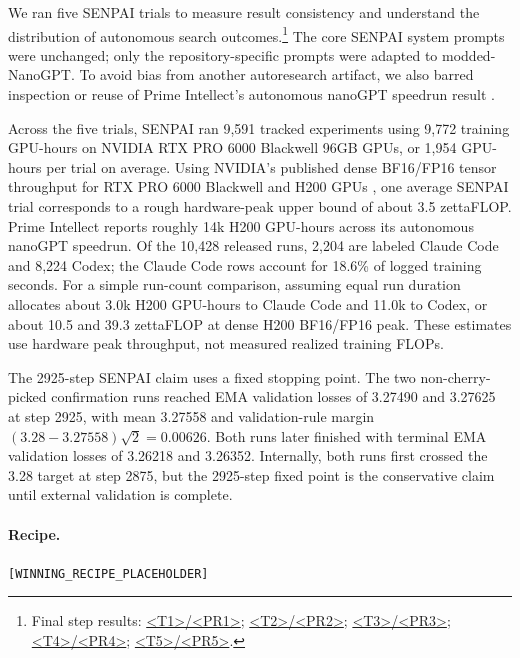 \documentclass{article}
\begin{document}
We ran five SENPAI trials to measure result consistency and understand the distribution of autonomous search outcomes.\footnote{Final step results: \href{https://github.com/morganmcg1/modded-nanogpt-senpai/pull/T1}{<T1>/<PR1>}; \href{https://github.com/morganmcg1/modded-nanogpt-senpai/pull/T2}{<T2>/<PR2>}; \href{https://github.com/morganmcg1/modded-nanogpt-senpai/pull/T3}{<T3>/<PR3>}; \href{https://github.com/morganmcg1/modded-nanogpt-senpai/pull/T4}{<T4>/<PR4>}; \href{https://github.com/morganmcg1/modded-nanogpt-senpai/pull/T5}{<T5>/<PR5>}.} The core SENPAI system prompts were unchanged; only the repository-specific prompts were adapted to modded-NanoGPT. To avoid bias from another autoresearch artifact, we also barred inspection or reuse of Prime Intellect's autonomous nanoGPT speedrun result \citep{primeintellect2026autonanogpt}.

Across the five trials, SENPAI ran 9,591 tracked experiments using 9,772 training GPU-hours on NVIDIA RTX PRO 6000 Blackwell 96GB GPUs, or 1,954 GPU-hours per trial on average. Using NVIDIA's published dense BF16/FP16 tensor throughput for RTX PRO 6000 Blackwell and H200 GPUs \citep{nvidia2025rtxpro6000blackwell,nvidia2026h200}, one average SENPAI trial corresponds to a rough hardware-peak upper bound of about 3.5 zettaFLOP. Prime Intellect reports roughly 14k H200 GPU-hours across its autonomous nanoGPT speedrun. Of the 10,428 released runs, 2,204 are labeled Claude Code and 8,224 Codex; the Claude Code rows account for 18.6\% of logged training seconds. For a simple run-count comparison, assuming equal run duration allocates about 3.0k H200 GPU-hours to Claude Code and 11.0k to Codex, or about 10.5 and 39.3 zettaFLOP at dense H200 BF16/FP16 peak. These estimates use hardware peak throughput, not measured realized training FLOPs.

The 2925-step SENPAI claim uses a fixed stopping point. The two non-cherry-picked confirmation runs reached EMA validation losses of 3.27490 and 3.27625 at step 2925, with mean 3.27558 and validation-rule margin $(3.28-3.27558)\sqrt{2}=0.00626$. Both runs later finished with terminal EMA validation losses of 3.26218 and 3.26352. Internally, both runs first crossed the 3.28 target at step 2875, but the 2925-step fixed point is the conservative claim until external validation is complete.

\paragraph{Recipe.}
\texttt{[WINNING\_RECIPE\_PLACEHOLDER]}
\end{document}
